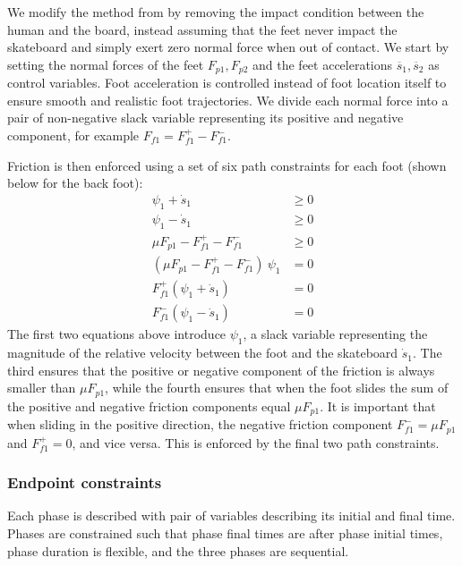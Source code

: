 \documentclass[default,iicol]{sn-jnl}
\begin{document}
We modify the method from \cite{patel_contact-implicit_2019} by removing the impact condition between the human and the board, instead assuming that the feet never impact the skateboard and simply exert zero normal force when out of contact.
We start by setting the normal forces of the feet $F_{p1}, F_{p2}$ and the feet accelerations $\ddot{s_1}, \ddot{s_2}$ as control variables.
Foot acceleration is controlled instead of foot location itself to ensure smooth and realistic foot trajectories.
We divide each normal force into a pair of non-negative slack variable representing its positive and negative component, for example $F_{f1} = F_{f1}^+ - F_{f1}^-$.

Friction is then enforced using a set of six path constraints for each foot (shown below for the back foot):
\begin{align} \label{e_frictioncontrol}
    \psi_1 + \dot s_1  &\geq 0 \label{eq:first slack equation} \\
    \psi_1 - \dot s_1  &\geq 0 \label{eq:second slack equation} \\
    \mu F_{p1} - F_{f1}^+ - F_{f1}^- &\geq 0 \\
    (\mu F_{p1} - F_{f1}^+ - F_{f1}^-)\ \psi_1  &= 0 \\
    F_{f1}^+ (\psi_1 + \dot s_1)  &= 0 \\
    F_{f1}^- (\psi_1 - \dot s_1)  &= 0
\end{align}
The first two equations above introduce $\psi_1$, a slack variable representing the magnitude of the relative velocity between the foot and the skateboard $\dot{s}_1$. The third ensures that the positive or negative component of the friction is always smaller than $\mu F_{p1}$, while the fourth ensures that when the foot slides the sum of the positive and negative friction components equal $\mu F_{p1}$. It is important that when sliding in the positive direction, the negative friction component $F_{f1}^- = \mu F_{p1}$ and $F_{f1}^+=0$, and vice versa. This is enforced by the final two path constraints.

\subsubsection{Endpoint constraints} \label{p_endpoints}
Each phase is described with pair of variables describing its initial and final time. Phases are constrained such that phase final times are after phase initial times, phase duration is flexible, and the three phases are sequential.
\end{document}
